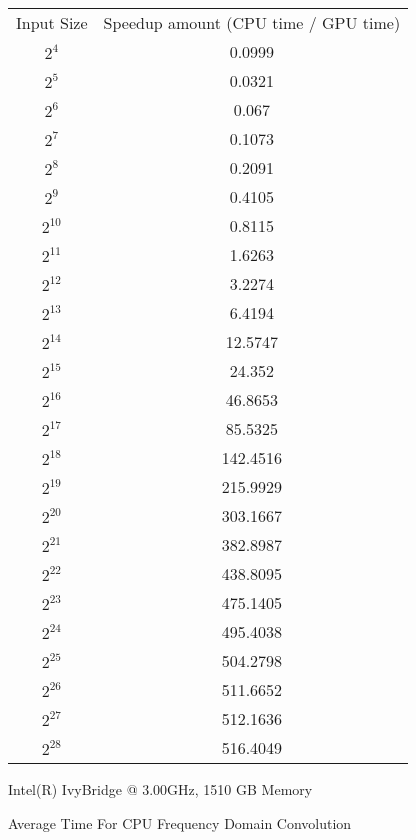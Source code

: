 \begin{center}
     \begin{tabular}{c | c}
         Input Size & Speedup amount (CPU time / GPU time) \\
$2^4$ & 0.0999 \\
$2^5$ & 0.0321 \\
$2^6$ & 0.067 \\
$2^7$ & 0.1073 \\
$2^8$ & 0.2091 \\
$2^9$ & 0.4105 \\
$2^{10}$ & 0.8115 \\
$2^{11}$ & 1.6263 \\
$2^{12}$ & 3.2274 \\
$2^{13}$ & 6.4194 \\
$2^{14}$ & 12.5747 \\
$2^{15}$ & 24.352 \\
$2^{16}$ & 46.8653 \\
$2^{17}$ & 85.5325 \\
$2^{18}$ & 142.4516 \\
$2^{19}$ & 215.9929 \\
$2^{20}$ & 303.1667 \\
$2^{21}$ & 382.8987 \\
$2^{22}$ & 438.8095 \\
$2^{23}$ & 475.1405 \\
$2^{24}$ & 495.4038 \\
$2^{25}$ & 504.2798 \\
$2^{26}$ & 511.6652 \\
$2^{27}$ & 512.1636 \\
$2^{28}$ & 516.4049
    \end{tabular}
    \newpage
    Intel(R) IvyBridge @ 3.00GHz, 1510 GB Memory
    
    Average Time For CPU Frequency Domain Convolution
   

\end{center}

